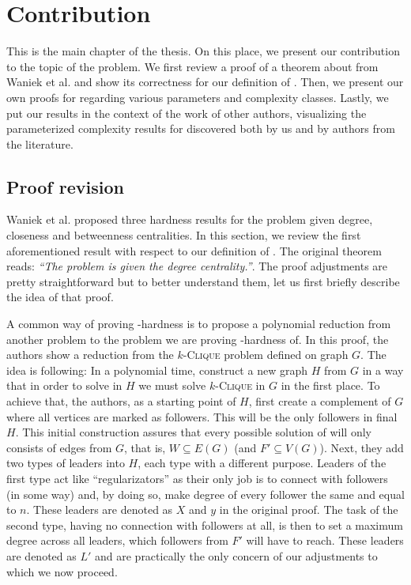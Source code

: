 \chapter{Contribution}\label{chapter:contribution}

This is the main chapter of the thesis.
On this place, we present our contribution to the topic of the \HL problem.
We first review a proof of a theorem about \HLdeg from Waniek et al. \cite{Waniek2017} and show
its correctness for our definition of \HL.
Then, we present our own proofs for \HLdeg regarding various parameters and complexity classes.
Lastly, we put our results in the context of the work of other authors,
visualizing the parameterized complexity results for \HLdeg discovered both by us and by authors
from the literature.


\section{Proof revision}\label{section:proofRevision}

Waniek et al. \cite{Waniek2017} proposed three hardness results for the \HL problem given degree, closeness and betweenness
centralities. In this section, we review the first aforementioned result with respect to our definition of \HLshort.
The original theorem reads: \emph{``The \HL problem is \NPc given the degree centrality.''}.
The proof adjustments are pretty straightforward but to better understand them,
let us first briefly describe the idea of that proof.

A common way of proving \NP-hardness is to propose a polynomial reduction from another \NPh problem to the
problem we are proving \NP-hardness of.
In this proof, the authors show a reduction from the $k$-\textsc{Clique} problem defined on graph $G$.
The idea is following: In a polynomial time, construct a new graph $H$ from $G$ in a way that
in order to solve \HL in $H$ we must solve $k$-\textsc{Clique} in $G$ in the first place.
To achieve that, the authors, as a starting point of $H$, first create a complement of $G$ 
where all vertices are marked as followers. This will be the only followers in final $H$.
This initial construction assures that every possible solution of \HLshort will only consists of edges from $G$, that is,
$W \subseteq E(G)$ (and $F' \subseteq V(G)$).
Next, they add two types of leaders into $H$, each type with a different purpose.
Leaders of the first type act like ``regularizators'' as their only job is to connect with followers (in some way) and,
by doing so, make degree of every follower the same and equal to $n$.
These leaders are denoted as $X$ and $y$ in the original proof.
The task of the second type, having no connection with followers at all,
is then to set a maximum degree across all leaders, which followers from $F'$ will have to reach.
These leaders are denoted as $L'$ and are practically the only concern of our adjustments to which we now proceed.

